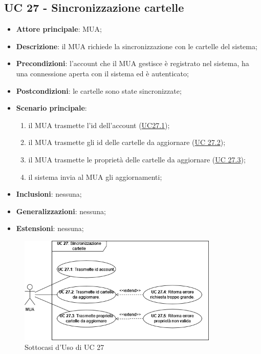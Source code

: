 
\subsection{UC 27 - Sincronizzazione cartelle} \label{sec:UC27}
    
    \begin{itemize}
        \item \textbf{Attore principale}: MUA;
        \item \textbf{Descrizione}: il MUA richiede la sincronizzazione con le cartelle del sistema;
        \item \textbf{Precondizioni}: l’account che il MUA gestisce è registrato nel sistema, ha una connessione aperta con il sistema ed è autenticato;
        \item \textbf{Postcondizioni}: le cartelle sono state sincronizzate;
        \item \textbf{Scenario principale}:
            \begin{enumerate}
                \item il MUA trasmette l'id dell'account (\hyperref[sec:UC27.1]{UC27.1});
                \item il MUA trasmette gli id delle cartelle da aggiornare (\hyperref[sec:UC27.2]{UC 27.2});
                \item il MUA trasmette le proprietà delle cartelle da aggiornare (\hyperref[sec:UC27.3]{UC 27.3});
                \item il sistema invia al MUA gli aggiornamenti;
            \end{enumerate}
        \item \textbf{Inclusioni}: nessuna;
        \item \textbf{Generalizzazioni}: nessuna;
        \item \textbf{Estensioni}: nessuna;
    \end{itemize}

    \begin{figure}[H]
        \includegraphics[width=0.85\textwidth]{sections/uc_imgs/UC27.png}
        \centering
        \caption{Sottocasi d'Uso di UC 27}
    \end{figure}

